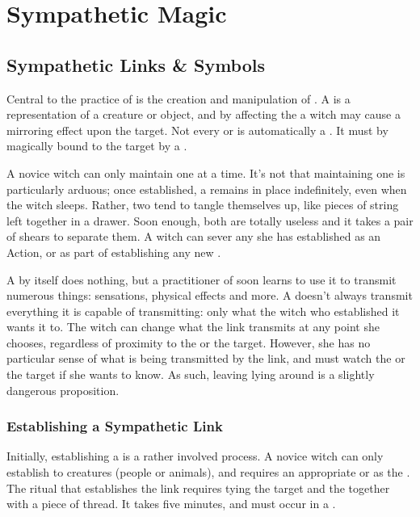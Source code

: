 \chapter{Sympathetic Magic}

\section{Sympathetic Links \& Symbols}

Central to the practice of  is the creation and manipulation of {\symbols}.
A {\symbol} is a representation of a creature or object, and by affecting the {\symbol} a witch may cause a mirroring effect upon the target.
Not every  or  is automatically a {\symbol}.
It must by magically bound to the target by a {\symlink}.

A novice witch can only maintain one {\symlink} at a time.
It's not that maintaining one is particularly arduous; once established, a {\symlink} remains in place indefinitely, even when the witch sleeps.
Rather, two {\symlinks} tend to tangle themselves up, like pieces of string left together in a drawer.
Soon enough, both are totally useless and it takes a pair of shears to separate them.
A witch can sever any {\symlink} she has established as an Action, or as part of establishing any new {\symlink}.

A {\symlink} by itself does nothing, but a practitioner of  soon learns to use it to transmit numerous things: sensations, physical effects and more.
A {\symlink} doesn't always transmit everything it is capable of transmitting: only what the witch who established it wants it to.
The witch can change what the link transmits at any point she chooses, regardless of proximity to the {\symbol} or the target.
However, she has no particular sense of what is being transmitted by the link, and must watch the {\symbol} or the target if she wants to know.
As such, leaving {\symbols} lying around is a slightly dangerous proposition.

\subsection{Establishing a Sympathetic Link}

Initially, establishing a {\symlink} is a rather involved process.
A novice witch can only establish {\symlinks} to creatures (people or animals), and requires an appropriate  or  as the {\symbol}.
The ritual that establishes the link requires tying the target and the {\symbol} together with a piece of thread.
It takes five minutes, and must occur in a .

